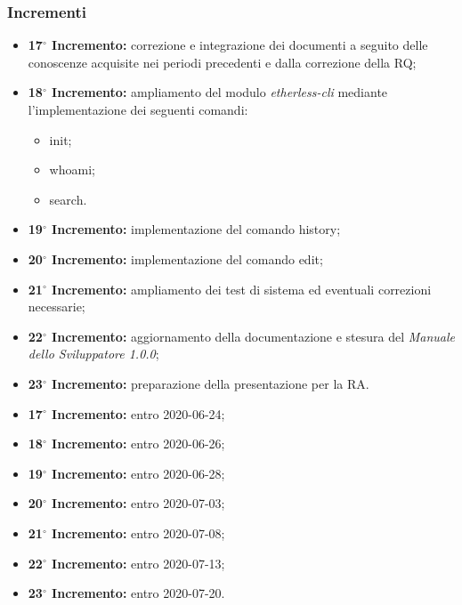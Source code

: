 	\subsubsection{Incrementi}
			\begin{itemize}
				\item \textbf{17$^{\circ}$ Incremento:} correzione e integrazione dei documenti a seguito delle conoscenze acquisite nei periodi precedenti e dalla correzione della RQ;
				\item \textbf{18$^{\circ}$ Incremento:} ampliamento del modulo \textit{etherless-cli} mediante l'implementazione dei seguenti comandi: 
					\begin{itemize}
						\item init; 
						\item whoami; 
						\item search.
					\end{itemize}
				\item \textbf{19$^{\circ}$ Incremento:} implementazione del comando history; 
				\item \textbf{20$^{\circ}$ Incremento:} implementazione del comando edit;
				\item \textbf{21$^{\circ}$ Incremento:} ampliamento dei test di sistema ed eventuali correzioni necessarie;  
				\item \textbf{22$^{\circ}$ Incremento:} aggiornamento della documentazione e stesura del \textit{Manuale dello Sviluppatore 1.0.0};
				\item \textbf{23$^{\circ}$ Incremento:} preparazione della presentazione per la RA.
			\end{itemize}
			\begin{itemize}
				\item \textbf{17$^{\circ}$ Incremento:} entro 2020-06-24;
				\item \textbf{18$^{\circ}$ Incremento:} entro 2020-06-26;
				\item \textbf{19$^{\circ}$ Incremento:} entro 2020-06-28;
				\item \textbf{20$^{\circ}$ Incremento:} entro 2020-07-03;
				\item \textbf{21$^{\circ}$ Incremento:} entro 2020-07-08;
				\item \textbf{22$^{\circ}$ Incremento:} entro 2020-07-13;
				\item \textbf{23$^{\circ}$ Incremento:} entro 2020-07-20.
			\end{itemize}
		
